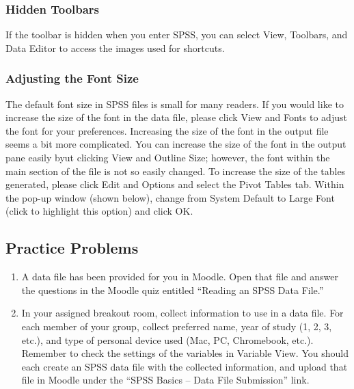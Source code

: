 \documentclass[]{book}
\providecommand{\tightlist}{%
  \setlength{\itemsep}{0pt}\setlength{\parskip}{0pt}}
\begin{document}
\subsubsection{Hidden Toolbars}\label{hidden-toolbars}

If the toolbar is hidden when you enter SPSS, you can select View,
Toolbars, and Data Editor to access the images used for shortcuts.

\subsubsection{Adjusting the Font Size}\label{adjusting-the-font-size}

The default font size in SPSS files is small for many readers. If you
would like to increase the size of the font in the data file, please
click View and Fonts to adjust the font for your preferences. Increasing
the size of the font in the output file seems a bit more complicated.
You can increase the size of the font in the output pane easily byut
clicking View and Outline Size; however, the font within the main
section of the file is not so easily changed. To increase the size of
the tables generated, please click Edit and Options and select the Pivot
Tables tab. Within the pop-up window (shown below), change from System
Default to Large Font (click to highlight this option) and click OK.

\subsection{Practice Problems}\label{practice-problems}

\begin{enumerate}
\def\labelenumi{\arabic{enumi}.}
\tightlist
\item
  A data file has been provided for you in Moodle. Open that file and
  answer the questions in the Moodle quiz entitled ``Reading an SPSS
  Data File.''
\item
  In your assigned breakout room, collect information to use in a data
  file. For each member of your group, collect preferred name, year of
  study (1, 2, 3, etc.), and type of personal device used (Mac, PC,
  Chromebook, etc.). Remember to check the settings of the variables in
  Variable View. You should each create an SPSS data file with the
  collected information, and upload that file in Moodle under the ``SPSS
  Basics -- Data File Submission'' link.
\end{enumerate}
\end{document}
